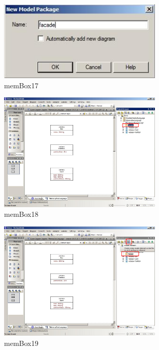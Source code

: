 \begin{figure}[!h]
	\centering
  \includegraphics[width=0.7\textwidth]{pics/memBox17.png}
	\caption{memBox17}
	\label{memBox17}
\end{figure}

\begin{figure}[!h]
	\centering
  \includegraphics[width=0.7\textwidth]{pics/memBox18.png}
	\caption{memBox18}
	\label{memBox18}
\end{figure}

\begin{figure}[!h]
	\centering
  \includegraphics[width=0.7\textwidth]{pics/memBox19.png}
	\caption{memBox19}
	\label{memBox19}
\end{figure}

